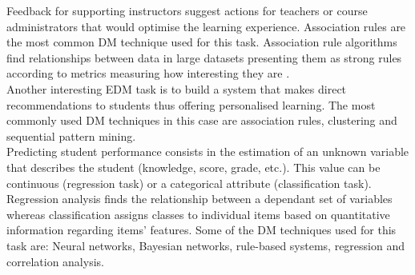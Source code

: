 \documentclass[11pt, oneside]{article}   	%
\begin{document}
Feedback for supporting instructors suggest actions for teachers or course administrators that would optimise the learning experience. Association rules are the most common DM technique used for this task. Association rule algorithms find relationships between data in large datasets presenting them as strong rules according to metrics measuring how interesting they are \cite{Piatetsky-Shapiro1991}.\\
Another interesting EDM task is to build a system that makes direct recommendations to students thus offering personalised learning. The most commonly used DM techniques in this case are association rules, clustering and sequential pattern mining.\\
Predicting student performance consists in the estimation of an unknown variable that describes the student (knowledge, score, grade, etc.). This value can be continuous (regression task) or a categorical attribute (classification task). Regression analysis finds the relationship between a dependant set of variables whereas classification assigns classes to individual items based on quantitative information regarding items' features. Some of the DM techniques used for this task are: Neural networks, Bayesian networks, rule-based systems, regression and correlation analysis. %
\end{document}
